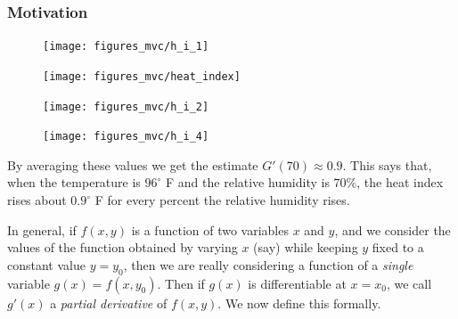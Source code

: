 \documentclass[12pt,letterpaper,reqno]{article}
\numberwithin{equation}{section}
\begin{document}
{\subsubsection{Motivation}
\begin{example}\hspace{15cm}
\begin{figure}[h]
	\begin{center}
		\texttt{[image: figures\_mvc/h\_i\_1]}
	\end{center}
\end{figure}
	
\begin{figure}[h]
	\begin{center}
	\texttt{[image: figures\_mvc/heat\_index]}
	\end{center}
\end{figure}

\begin{figure}[h]
	\begin{center}
		\texttt{[image: figures\_mvc/h\_i\_2]}
	\end{center}
\end{figure}

\newpage

\begin{figure}[h]
	\begin{center}
		\texttt{[image: figures\_mvc/h\_i\_4]}
	\end{center}
\end{figure}
By averaging these values we get the estimate $G'(70) \approx 0.9$. This says that, when the temperature is $96^\circ$ F and the relative humidity is $70\%$, the heat index rises about $0.9^\circ$ F for every percent the relative humidity rises.
\end{example} 
In general, if $f(x,y)$ is a function of two variables $x$ and $y$, and we consider the values of the function obtained by varying $x$ (say) while keeping $y$ fixed to a constant value $y=y_0$, then we are really considering a function of a \emph{single} variable $g(x)=f(x,y_0)$. Then if $g(x)$ is differentiable at $x=x_0$, we call $g'(x)$ a \emph{partial derivative} of $f(x,y)$. We now define this formally.

\newpage 
}
\end{document}
